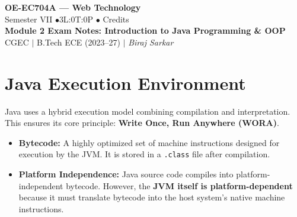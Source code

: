 \documentclass[12pt,a4paper]{article}
\begin{document}

\begin{center}
  {\LARGE\bfseries\color{myred} OE-EC704A --- Web Technology}\\[5pt]
  {\normalsize\color{mydark} Semester VII \quad$\bullet$\quad 3L:0T:0P \quad$\bullet$ Credits}\\[3pt]
  {\normalsize\color{myteal}\textbf{Module 2 Exam Notes: Introduction to Java Programming \& OOP}}\\[3pt]
  {\small\color{mydark} CGEC \;$|$\; B.Tech ECE (2023--27) \;$|$\; \textit{Biraj Sarkar}}
\end{center}
\vspace{2pt}
\noindent{\color{myred}\rule{\linewidth}{1.5pt}}
\vspace{2pt}

\hypersetup{linkcolor=mydark}
\tableofcontents
\hypersetup{linkcolor=myteal}
\newpage

\section{Java Execution Environment}

Java uses a hybrid execution model combining compilation and interpretation. This ensures its core principle: \textbf{Write Once, Run Anywhere (WORA)}.

\begin{tcolorbox}[defbox, title={\textbf{Bytecode and Platform Independence}}]
\begin{itemize}[leftmargin=*, itemsep=3pt]
  \item \textbf{Bytecode:} A highly optimized set of machine instructions designed for execution by the JVM. It is stored in a \texttt{.class} file after compilation.
  \item \textbf{Platform Independence:} Java source code compiles into platform-independent bytecode. However, the \textbf{JVM itself is platform-dependent} because it must translate bytecode into the host system's native machine instructions.
\end{itemize}
\end{tcolorbox}
\end{document}
